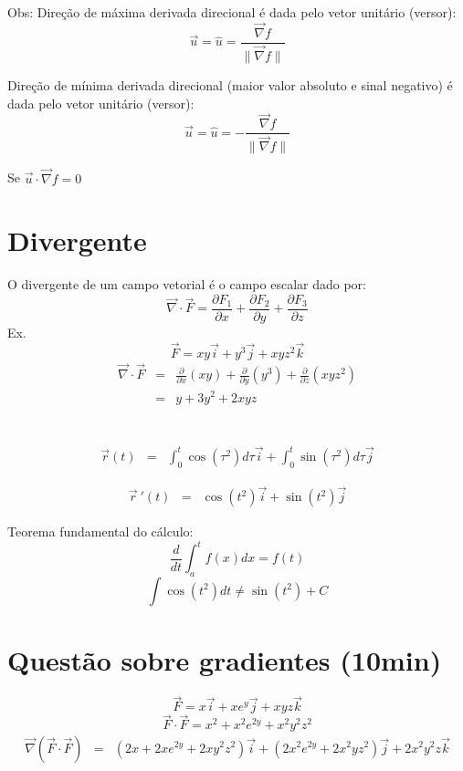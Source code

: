 \documentclass[a4paper,10pt]{article}
\begin{document}
  Obs: Direção de máxima derivada direcional é dada pelo vetor unitário (versor):
  $$\vec{u}=\hat{u}=\frac{\vec{\nabla} f}{\|\vec{\nabla} f\|}$$
 
 Direção de mínima derivada direcional (maior valor absoluto e sinal negativo) é dada pelo vetor unitário (versor):
  $$\vec{u}=\hat{u}=-\frac{\vec{\nabla} f}{\|\vec{\nabla} f\|}$$
 
 Se $\vec{u}\cdot \vec{\nabla}f = 0$

 \section{Divergente}
 O divergente de um campo vetorial é o campo escalar dado por:
 $$\vec{\nabla}\cdot \vec{F} = \frac{\partial F_1}{\partial x}+\frac{\partial F_2}{\partial y}+\frac{\partial F_3}{\partial z}$$
 Ex.
 $$     \vec{F}=xy\vec{i}+y^3\vec{j}+xyz^2\vec{k}$$
  \begin{eqnarray*}
 \vec{\nabla}\cdot\vec{F}&=&\frac{\partial }{\partial x}(xy)+\frac{\partial }{\partial y}(y^3)+\frac{\partial }{\partial z}(xyz^2)\\
 &=&y+ 3y^2+2xyz
 \end{eqnarray*}
 
 
 
 \section{}
 
 \begin{eqnarray*}
\vec{r}(t)&=&\int_0^t\cos(\tau^2)d\tau\vec{i}+\int_0^t\sin(\tau^2)d\tau\vec{j}  
 \end{eqnarray*}

 \begin{eqnarray*}
\vec{r}\!~'(t)&=&\cos(t^2)\vec{i}+\sin(t^2)\vec{j}  
 \end{eqnarray*}

 Teorema fundamental do cálculo:
 $$\frac{d}{dt}\int_a^t f(x)dx = f(t)$$
$$\int\cos(t^2)dt \neq \sin(t^2)+C$$
 
 
 \section{Questão sobre gradientes (10min)}

 $$\vec{F}=x\vec{i}+xe^y\vec{j} + xyz\vec{k}$$ 
$$\vec{F}\cdot \vec{F}=x^2+x^2e^{2y} + x^2y^2z^2$$ 
\begin{eqnarray*}
\vec{\nabla}\left(\vec{F}\cdot\vec{F}\right)&=& \left(2x+2xe^{2y}+2xy^2z^2\right) \vec{i}+
\left(2x^2e^{2y}+2x^2yz^2\right) \vec{j}
+2 x^2y^2z \vec{k}
 \end{eqnarray*}
\end{document}
